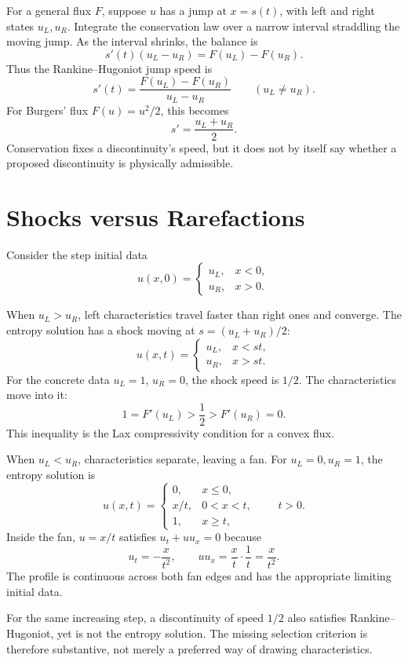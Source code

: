 For a general flux \(F\), suppose \(u\) has a jump at \(x=s(t)\), with left and right states \(u_L,u_R\). Integrate the conservation law over a narrow interval straddling the moving jump. As the interval shrinks, the balance is
\[
 s'(t)(u_L-u_R)=F(u_L)-F(u_R).
\]
Thus the Rankine--Hugoniot jump speed is
\[
 \boxed{s'(t)=\frac{F(u_L)-F(u_R)}{u_L-u_R}}
 \qquad(u_L\ne u_R).
\]
For Burgers' flux \(F(u)=u^2/2\), this becomes
\[
 \boxed{s'=\frac{u_L+u_R}{2}.}
\]
Conservation fixes a discontinuity's speed, but it does not by itself say whether a proposed discontinuity is physically admissible.

\section{Shocks versus Rarefactions}

Consider the step initial data
\[
 u(x,0)=\begin{cases}u_L,&x<0,\\u_R,&x>0.\end{cases}
\]

When \(u_L>u_R\), left characteristics travel faster than right ones and converge. The entropy solution has a shock moving at
\(s=(u_L+u_R)/2\):
\[
 u(x,t)=
 \begin{cases}u_L,&x<st,\\u_R,&x>st.\end{cases}
\]
For the concrete data \(u_L=1\), \(u_R=0\), the shock speed is \(1/2\). The characteristics move into it:
\[
 1=F'(u_L)>\frac12>F'(u_R)=0.
\]
This inequality is the Lax compressivity condition for a convex flux.

When \(u_L<u_R\), characteristics separate, leaving a fan. For \(u_L=0,u_R=1\), the entropy solution is
\[
 \boxed{
 u(x,t)=
 \begin{cases}
 0,&x\le0,\\
 x/t,&0<x<t,\\
 1,&x\ge t,
 \end{cases}\qquad t>0.}
\]
Inside the fan, \(u=x/t\) satisfies \(u_t+uu_x=0\) because
\[
 u_t=-\frac{x}{t^2},\qquad
 uu_x=\frac xt\cdot\frac1t=\frac{x}{t^2}.
\]
The profile is continuous across both fan edges and has the appropriate limiting initial data.

For the same increasing step, a discontinuity of speed \(1/2\) also satisfies Rankine--Hugoniot, yet is not the entropy solution. The missing selection criterion is therefore substantive, not merely a preferred way of drawing characteristics.

